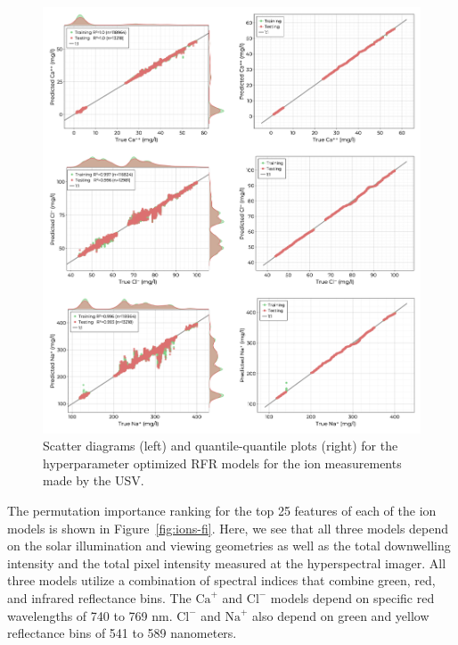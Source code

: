 \documentclass[remotesensing,article,submit,pdftex,moreauthors]{Definitions/mdpi}
\begin{document}
\begin{figure}
\centering
\includegraphics[width=\columnwidth]{paper/figures/results/fits/ions-fitres.png}
\caption{Scatter diagrams (left) and quantile-quantile plots (right) for the hyperparameter optimized RFR models for the ion measurements made by the USV.\label{fig:ions-fit}}
\end{figure}  

The permutation importance ranking for the top 25 features of each of the ion models is shown in Figure~\ref{fig:ions-fi}. Here, we see that all three models depend on the solar illumination and viewing geometries as well as the total downwelling intensity and the total pixel intensity measured at the hyperspectral imager. All three models utilize a combination of spectral indices that combine green, red, and infrared reflectance bins. The $\textrm{Ca}^{+}$ and $\textrm{Cl}^{-}$ models depend on specific red wavelengths of 740 to 769 nm. $\textrm{Cl}^{-}$ and $\textrm{Na}^{+}$ also depend on green and yellow reflectance bins of 541 to 589 nanometers.
\end{document}
